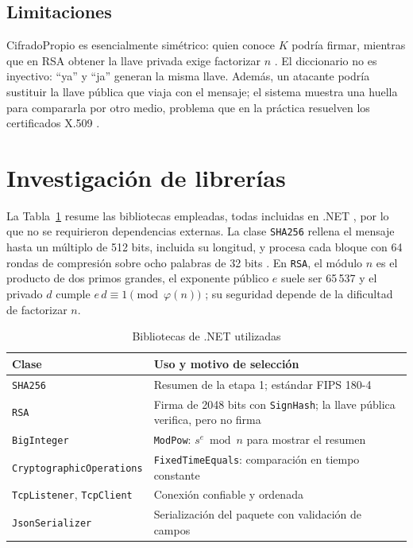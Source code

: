 \documentclass[conference]{IEEEtran}
\begin{document}
\subsection{Limitaciones}

CifradoPropio es esencialmente simétrico: quien conoce $K$ podría firmar, mientras que en RSA obtener la llave privada exige factorizar $n$ \cite{rsa}. El diccionario no es inyectivo: ``ya'' y ``ja'' generan la misma llave. Además, un atacante podría sustituir la llave pública que viaja con el mensaje; el sistema muestra una huella para compararla por otro medio, problema que en la práctica resuelven los certificados X.509 \cite{rfc5280}.

\section{Investigación de librerías}
\label{sec:librerias}

La Tabla~\ref{tab:librerias} resume las bibliotecas empleadas, todas incluidas en .NET \cite{msApi}, por lo que no se requirieron dependencias externas. La clase \texttt{SHA256} rellena el mensaje hasta un múltiplo de 512 bits, incluida su longitud, y procesa cada bloque con 64 rondas de compresión sobre ocho palabras de 32 bits \cite{fips180}. En \texttt{RSA}, el módulo $n$ es el producto de dos primos grandes, el exponente público $e$ suele ser 65\,537 y el privado $d$ cumple $e\,d \equiv 1 \pmod{\varphi(n)}$ \cite{rsa}; su seguridad depende de la dificultad de factorizar $n$.

\begin{table}[!t]
\caption{Bibliotecas de .NET utilizadas}
\label{tab:librerias}
\centering
\scriptsize
\begin{tabular}{@{}>{\raggedright\arraybackslash}p{2.6cm}>{\raggedright\arraybackslash}p{5.8cm}@{}}
\toprule
\textbf{Clase} & \textbf{Uso y motivo de selección} \\
\midrule
\texttt{SHA256} & Resumen de la etapa 1; estándar FIPS 180-4 \cite{fips180} \\
\texttt{RSA} & Firma de 2048 bits con \texttt{SignHash}; la llave pública verifica, pero no firma \cite{rfc8017} \\
\texttt{BigInteger} & \texttt{ModPow}: $s^{e} \bmod n$ para mostrar el resumen \\
\texttt{Cryptographic\allowbreak Operations} & \texttt{FixedTimeEquals}: comparación en tiempo constante \\
\texttt{TcpListener}, \texttt{TcpClient} & Conexión confiable y ordenada \\
\texttt{JsonSerializer} & Serialización del paquete con validación de campos \\
\bottomrule
\end{tabular}
\end{table}
\end{document}
